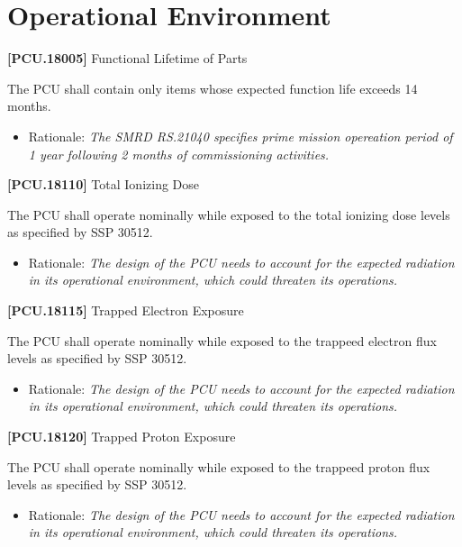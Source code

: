 \documentclass[12pt,oneside,oldfontcommands]{memoir}
\begin{document}
\section{Operational Environment}
\label{operationalenvironment}

\textbf{[PCU.18005]} Functional Lifetime of Parts

The \gls{PCU} shall contain only items whose expected function life exceeds 14 months.

\begin{itemize}
\item{} Rationale: \emph{The SMRD RS.21040 specifies prime mission opereation period of 1 year following 2 months of commissioning activities.}

\end{itemize}

\textbf{[PCU.18110]} Total Ionizing Dose

The \gls{PCU} shall operate nominally while exposed to the total ionizing dose levels as specified by SSP 30512.

\begin{itemize}
\item{} Rationale: \emph{The design of the PCU needs to account for the expected radiation in its operational environment, which could threaten its operations.}

\end{itemize}

\textbf{[PCU.18115]} Trapped Electron Exposure

The \gls{PCU} shall operate nominally while exposed to the trappeed electron flux levels as specified by SSP 30512.

\begin{itemize}
\item{} Rationale: \emph{The design of the PCU needs to account for the expected radiation in its operational environment, which could threaten its operations.}

\end{itemize}

\textbf{[PCU.18120]} Trapped Proton Exposure

The \gls{PCU} shall operate nominally while exposed to the trappeed proton flux levels as specified by SSP 30512.

\begin{itemize}
\item{} Rationale: \emph{The design of the PCU needs to account for the expected radiation in its operational environment, which could threaten its operations.}

\end{itemize}
\end{document}
